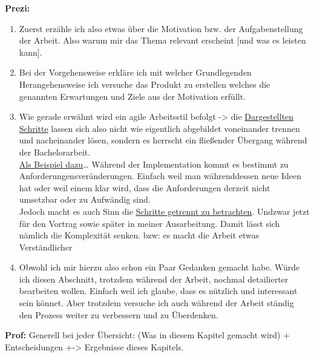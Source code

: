 {	\myNewSection
	\textbf{Prezi:}
	\begin{enumerate}
		\item Zuerst erzähle ich also etwas über die Motivation bzw. der Aufgabenstellung der Arbeit. Also warum mir das Thema relevant erscheint [und was es leisten kann]. \myCheckmark
		\item Bei der Vorgehensweise erkläre ich mit welcher Grundlegenden Herangehensweise ich versuche das Produkt zu erstellen welches die genannten Erwartungen und Ziele aus der Motivation erfüllt. \myCheckmark
		\item Wie gerade erwähnt wird ein agile Arbeitsstil befolgt -> die \underline{Dargestellten Schritte} lassen sich also nicht wie eigentlich abgebildet voneinander trennen und nacheinander lösen, sondern es herrscht ein fließender Übergang während der Bachelorarbeit.
		\\ \underline{Als Beispiel dazu}… Während der Implementation kommt es bestimmt zu Anforderungensveränderungen. Einfach weil man währenddessen neue Ideen hat oder weil einem klar wird, dass die Anforderungen derzeit nicht umsetzbar oder zu Aufwändig sind.
		\\ Jedoch macht es auch Sinn die \underline{Schritte getrennt zu betrachten}. Undzwar jetzt für den Vortrag sowie später in meiner Ausarbeitung. Damit lässt sich nämlich die Komplexität senken. bzw: es macht die Arbeit etwas Verständlicher \myCheckmark
		\item Obwohl ich mir hierzu also schon ein Paar Gedanken gemacht habe. Würde ich diesen Abschnitt, trotzdem während der Arbeit, nochmal detailierter bearbeiten wollen. Einfach weil ich glaube, dass es nützlich und interessant sein könnet. Aber trotzdem versuche ich auch während der Arbeit ständig den Prozess weiter zu verbessern und zu Überdenken. \myCheckmark
	\end{enumerate}
	
	
	
	\textbf{Prof:} Generell bei jeder Übersicht: (Was in diesem Kapitel gemacht wird) + Entscheidungen +-> Ergebnisse dieses Kapitels. \myCheckmark
	
	
	
}
